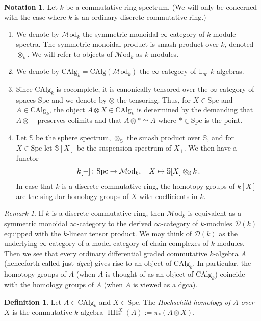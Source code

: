 \documentclass[oneside, a4paper, 12pt]{article}
\numberwithin{equation}{section}
\DeclareMathOperator{\HH}{HH}
\newcommand{\Mod}{\mathcal{M}\mathrm{od}}
\newcommand{\CAlg}{\mathrm{CAlg}}
\newcommand{\Spc}{\mathrm{Spc}}
\newcommand{\co}{\colon\thinspace}
\theoremstyle{plain}
\theoremstyle{definition}
\newtheorem{definition}[theorem]{Definition}
\newtheorem{notation}[theorem]{Notation}
\theoremstyle{remark}
\newtheorem{remark}[theorem]{Remark}
\begin{document}
\begin{notation}
Let $k$ be a commutative ring spectrum. (We will only be concerned with the case where $k$ is an ordinary discrete commutative ring.)
\begin{enumerate}
\item[(1)] We denote by $\Mod_k$ the symmetric monoidal $\infty$-category of $k$-module spectra. The symmetric monoidal product is smash product over $k$, denoted $\otimes_k$. We will refer to objects of $\Mod_k$ as $k$-modules.
\item[(2)]  We denote by $\CAlg_k=\CAlg(\Mod_k)$ the $\infty$-category of $\mathbb{E}_\infty$-$k$-algebras.
\item[(3)] Since $\CAlg_k$ is cocomplete, it is canonically tensored over the $\infty$-category of spaces $\Spc$ and we denote by $\otimes$ the tensoring. Thus, for $X\in \Spc$ and $A\in \CAlg_k$, the object $A\otimes X\in \CAlg_k$ is determined by the demanding that $A\otimes -$ preserves colimits and that $A\otimes \ast\simeq A$ where $\ast\in \Spc$ is the point.
\item[(4)] Let $\mathbb{S}$ be the sphere spectrum, $\otimes_{\mathbb{S}}$ the smash product over $\mathbb{S}$, and for $X\in \Spc$ let $\mathbb{S}[X]$ be the suspension spectrum of $X_+$. We then have a functor
\[
k[-]\co \Spc\to \Mod_k,\quad X\mapsto \mathbb{S}[X]\otimes_{\mathbb{S}} k\, .
\]
In case that $k$ is a discrete commutative ring, the homotopy groups of $k[X]$ are the singular homology groups of $X$ with coefficients in $k$.
\end{enumerate}
\end{notation}

\begin{remark}
If $k$ is a discrete commutative ring, then $\Mod_k$ is equivalent as a symmetric monoidal $\infty$-category to the derived $\infty$-category of $k$-modules $\mathcal{D}(k)$ equipped with the $k$-linear tensor product. We may think of $\mathcal{D}(k)$ as the underlying $\infty$-category of a model category of chain complexes of $k$-modules. Then we see that every ordinary differential graded commutative $k$-algebra $A$ (henceforth called just \emph{dgca}) gives rise to an object of $\CAlg_k$. In particular, the homotopy groups of $A$ (when $A$ is thought of as an object of $\CAlg_k$) coincide with the homology groups of $A$ (when $A$ is viewed as a dgca).
\end{remark}

\begin{definition} \label{def:hh}
Let $A\in \CAlg_k$ and $X\in \Spc$. The \emph{Hochschild homology of $A$ over $X$} is the commutative $k$-algebra $\HH_\ast^X(A):=\pi_\ast(A\otimes X)$.
\end{definition}
\end{document}
